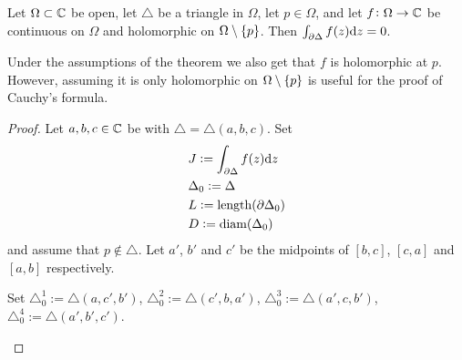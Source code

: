 \documentclass[11pt,a4paper]{article}
\begin{document}
\begin{theorem}
  \label{thm:cauchy-triangle}
  Let $\Omega \subset \mathbb{C}$ be open,
  let $\triangle$ be a triangle in $\Omega$,
  let $p \in \Omega$,
  and let $f \colon \Omega \to \mathbb{C}$ be continuous on $\Omega$ and
  holomorphic on $\Omega \setminus \left\{p\right\}$.
  Then $\int_{\partial \Delta} f(z) \mathrm{d} z = 0$.
\end{theorem}
\begin{remark}
  Under the assumptions of the theorem we also get that $f$ is holomorphic
  at $p$.
  However, assuming it is only holomorphic on $\Omega \setminus \left\{p\right\}$
  is useful for the proof of Cauchy's formula.
\end{remark}
\begin{proof}
  Let $a,b,c \in \mathbb{C}$ be with $\triangle = \triangle(a,b,c)$.
  Set
  \begin{align*}
    &J := \int_{\partial \Delta} f(z) \mathrm{d} z \\
    &\Delta_0 := \Delta \\
    &L := \mathrm{length}(\partial \Delta_0) \\
    &D := \operatorname{diam}(\Delta_0)
  \end{align*}
  and assume that $p \notin \triangle$.
  Let $a'$, $b'$ and $c'$ be the midpoints of $[b,c]$, $[c,a]$ and $[a,b]$
  respectively.
  \begin{center}
  \end{center}
  Set $\triangle_0^1 := \triangle(a,c',b')$,
  $\triangle_0^2 := \triangle(c',b,a')$,
  $\triangle_0^3 := \triangle(a',c,b')$,
  $\triangle_0^4 := \triangle(a',b',c')$.
  \begin{center}
\end{center}
\end{proof}
\end{document}
